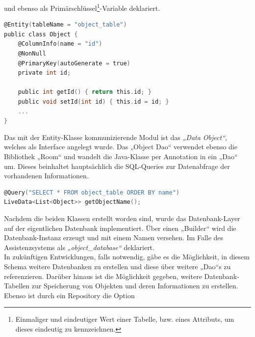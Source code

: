 und ebenso als Primärschlüssel\footnote{Einmaliger und eindeutiger Wert einer Tabelle, bzw. eines Attributs, um dieses eindeutig zu kennzeichnen.}-Variable 
deklariert.
\\ 
\linebreak
\begin{lstlisting}[language=C,
    frame=lines,           % Ein Rahmen um den Code (single for box, lines for top and bottom)
    xleftmargin=\parindent,  % Rahmen link von den Zahlen
    style=algoBericht,
    label={code:entity},
    captionpos=b,           % Caption unter den Code setzen
caption={Entity Code zur Initialisierung der Objekte}]
@Entity(tableName = "object_table")
public class Object {
    @ColumnInfo(name = "id")
    @NonNull
    @PrimaryKey(autoGenerate = true)
    private int id;

    public int getId() { return this.id; }
    public void setId(int id) { this.id = id; }
    ... 
}
\end{lstlisting}
\pagebreak
Das mit der Entity-Klasse kommunizierende Modul ist das \textit{„Data Object“}, welches als Interface angelegt wurde. Das „Object Dao“ verwendet ebenso die Bibliothek 
„Room“ und wandelt die Java-Klasse per Annotation in ein „Dao“ um. Dieses beinhaltet hauptsächlich die SQL-Queries zur Datenabfrage der vorhandenen Informationen. 
\\
\linebreak
\begin{lstlisting}[language=C,
    frame=lines,           % Ein Rahmen um den Code (single for box, lines for top and bottom)
    xleftmargin=\parindent,  % Rahmen link von den Zahlen
    style=algoBericht,
    label={code:query},
    captionpos=b,           % Caption unter den Code setzen
caption={SQL-Query zur Abfrage der Objekt-Namen}]
@Query("SELECT * FROM object_table ORDER BY name")
LiveData<List<Object>> getObjectName();
\end{lstlisting}
Nachdem die beiden Klassen erstellt worden sind, wurde das Datenbank-Layer auf der eigentlichen Datenbank implementiert. Über einen „Builder“ wird die 
Datenbank-Instanz erzeugt und mit einem Namen versehen. Im Falle des Assistenzsystems als \textit{„object\_database“} deklariert. 
\\ 
In zukünftigen Entwicklungen, 
falls notwendig, gäbe es die Möglichkeit, in diesem Schema weitere Datenbanken zu erstellen und diese über weitere „Dao“s zu referenzieren. Darüber hinaus ist die 
Möglichkeit gegeben, weitere Datenbank-Tabellen zur Speicherung von Objekten und deren Informationen zu erstellen. Ebenso ist durch ein Repository die Option 
